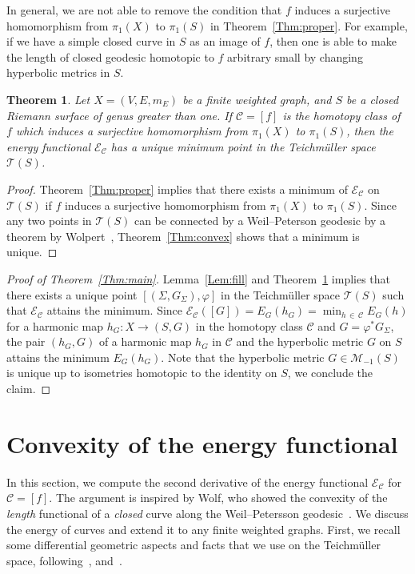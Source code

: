 \documentclass[11pt]{article}
\newtheorem{theo}{Theorem}[section]
\theoremstyle{definition}
\newcommand{\Mc}{\mathcal{M}}
\numberwithin{equation}{section}
\renewcommand{\SS}{\Sigma}
\newcommand{\f}{\varphi}
\newcommand{\Cc}{\mathcal{C}}
\renewcommand{\Mc}{\mathcal{M}}
\newcommand{\Ec}{\mathcal{E}}
\newcommand{\Tc}{\mathcal{T}}
\begin{document}
In general, we are not able to remove the condition that $f$ induces a surjective homomorphism from $\pi_1(X)$ to $\pi_1(S)$ in Theorem~\ref{Thm:proper}. For example, if we have a simple closed curve in $S$ as an image of $f$, then one is able to make the length of closed geodesic homotopic to $f$ arbitrary small by changing hyperbolic metrics in $S$.



\begin{theo}\label{Thm:general_main}
Let $X=(V, E, m_E)$ be a finite weighted graph, and $S$ be a closed Riemann surface of genus greater than one. If $\Cc=[f]$ is the homotopy class of $f$ which induces a surjective homomorphism from $\pi_1(X)$ to $\pi_1(S)$, then the energy functional $\Ec_\Cc$ has a unique minimum point in the Teichm\"uller space $\Tc(S)$.
\end{theo}


\begin{proof}
Theorem~\ref{Thm:proper} implies that there exists a minimum of $\Ec_\Cc$ on $\Tc(S)$ if $f$ induces a surjective homomorphism from $\pi_1(X)$ to $\pi_1(S)$. Since any two points in $\Tc(S)$ can be connected by a Weil--Peterson geodesic by a theorem by Wolpert~\cite[Corollary~5.6]{WolpertNielsen}, Theorem~\ref{Thm:convex} shows that a minimum is unique.
\end{proof}


\begin{proof}[{Proof of Theorem~\ref{Thm:main}}]
Lemma~\ref{Lem:fill} and Theorem~\ref{Thm:general_main} implies that there exists a unique point $[(\SS, G_{\SS}), \f]$ in the Teichm\"uller space $\Tc(S)$ such that $\Ec_\Cc$ attains the minimum. Since $\Ec_\Cc([G])=E_{G}(h_G)=\min_{h\,\in\,\Cc}E_G(h)$ for a harmonic map $h_G:X \to (S, G)$ in the homotopy class $\Cc$ and $G=\f^\ast G_{\SS}$, the pair $(h_G, G)$ of a harmonic map $h_G$ in $\Cc$ and the hyperbolic metric $G$ on $S$ attains the minimum $E_G(h_G)$. Note that the hyperbolic metric $G \in \Mc_{-1}(S)$ is unique up to isometries homotopic to the identity on $S$, we conclude the claim.
\end{proof}



\section{Convexity of the energy functional}\label{Sec:convex}

In this section, we compute the second derivative of the energy functional $\Ec_\Cc$ for $\Cc=[f]$. The argument is inspired by Wolf, who showed the convexity of the \emph{length} functional of a \emph{closed} curve along the Weil--Petersson geodesic~\cite{Wolf}. We discuss the energy of curves and extend it to any finite weighted graphs. First, we recall some differential geometric aspects and facts that we use on the Teichm\"uller space, following~\cite{Yamada}, \cite{Yamada2} and~\cite{Wolf}.
\end{document}
